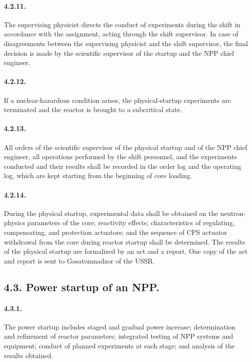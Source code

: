 \documentclass[openright]{bookest}
\begin{document}
\paragraph{4.2.11.} The supervising physicist directs the conduct of experiments during the shift in accordance with the assignment, acting through the shift supervisor. In case of disagreements between the supervising physicist and the shift supervisor, the final decision is made by the scientific supervisor of the startup and the NPP chief engineer.

\paragraph{4.2.12.} If a nuclear-hazardous condition arises, the physical-startup experiments are terminated and the reactor is brought to a subcritical state.

\paragraph{4.2.13.} All orders of the scientific supervisor of the physical startup and of the NPP chief engineer, all operations performed by the shift personnel, and the experiments conducted and their results shall be recorded in the order log and the operating log, which are kept starting from the beginning of core loading.

\paragraph{4.2.14.} During the physical startup, experimental data shall be obtained on the neutron-physics parameters of the core; reactivity effects; characteristics of regulating, compensating, and protection actuators; and the sequence of CPS actuator withdrawal from the core during reactor startup shall be determined. The results of the physical startup are formalized by an act and a report. One copy of the act and report is sent to Gosatomnadzor of the USSR.

\subsection*{4.3. Power startup of an NPP.}

\paragraph{4.3.1.} The power startup includes staged and gradual power increase; determination and refinement of reactor parameters; integrated testing of NPP systems and equipment; conduct of planned experiments at each stage; and analysis of the results obtained.
\end{document}
